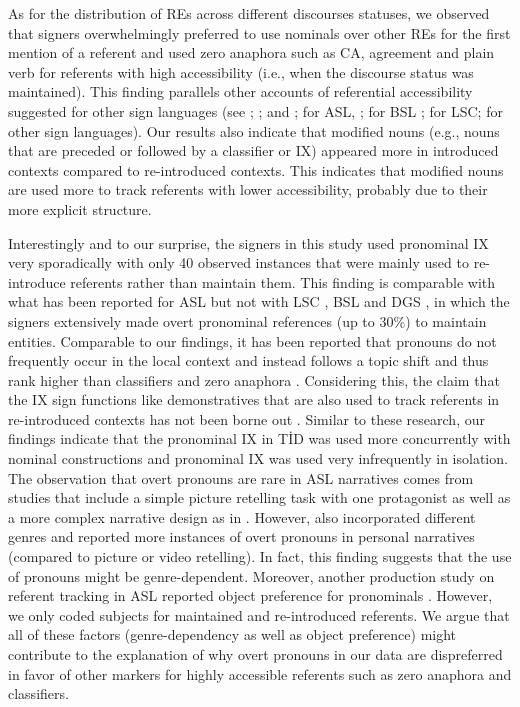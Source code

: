 \documentclass[review]{elsarticle} %
\begin{document}
As for the distribution of REs across different discourses statuses, we
observed that signers overwhelmingly preferred to use nominals over
other REs for the first mention of a referent and used zero anaphora
such as CA, agreement and plain verb for referents with high
accessibility (i.e., when the discourse status was maintained). This
finding parallels other accounts of referential accessibility suggested
for other sign languages (see \citet{frederiksen2016};
\citet{czubek2017}; and \citet{swabey2002}; for ASL, \citet{morgan2005};
for BSL \citet{bel2015}; \citet{barbera2009} for LSC;
\citet{ferrara2022} for other sign languages). Our results also indicate
that modified nouns (e.g., nouns that are preceded or followed by a
classifier or IX) appeared more in introduced contexts compared to
re-introduced contexts. This indicates that modified nouns are used more
to track referents with lower accessibility, probably due to their more
explicit structure.

Interestingly and to our surprise, the signers in this study used
pronominal IX very sporadically with only 40 observed instances that
were mainly used to re-introduce referents rather than maintain them.
This finding is comparable with what has been reported for ASL
\citep{swabey2002, frederiksen2016, czubek2017} but not with LSC
\citep{bel2015}, BSL \citep{morgan2005} and DGS \citep{perniss2015}, in
which the signers extensively made overt pronominal references (up to
30\%) to maintain entities. Comparable to our findings, it has been
reported that pronouns do not frequently occur in the local context and
instead follows a topic shift and thus rank higher than classifiers and
zero anaphora \citetext{\citealp[see][ for
LSC]{barbera2009}; \citealp[and][ for TİD]{nuhbalaoglu2018}}.
Considering this, the claim that the IX sign functions like
demonstratives that are also used to track referents in re-introduced
contexts has not been borne out \citep{koulidobrova2016}. Similar to
these research, our findings indicate that the pronominal IX in TİD was
used more concurrently with nominal constructions and pronominal IX was
used very infrequently in isolation. The observation that overt pronouns
are rare in ASL narratives comes from studies that include a simple
picture retelling task with one protagonist
\citep[e.g.,][]{frederiksen2016} as well as a more complex narrative
design as in \citep{czubek2017}. However, \citet{czubek2017} also
incorporated different genres and reported more instances of overt
pronouns in personal narratives (compared to picture or video
retelling). In fact, this finding suggests that the use of pronouns
might be genre-dependent. Moreover, another production study on referent
tracking in ASL reported object preference for pronominals
\citep{frederiksen2017}. However, we only coded subjects for maintained
and re-introduced referents. We argue that all of these factors
(genre-dependency as well as object preference) might contribute to the
explanation of why overt pronouns in our data are dispreferred in favor
of other markers for highly accessible referents such as zero anaphora
and classifiers.
\end{document}
